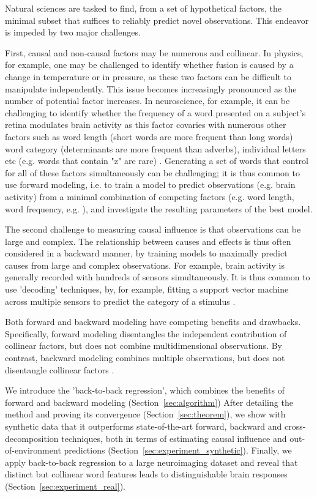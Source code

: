 Natural sciences are tasked to find, from a set of hypothetical factors, the minimal subset that suffices to reliably predict novel observations. This endeavor is impeded by two major challenges.

First, causal and non-causal factors may be numerous and collinear. In physics, for example, one may be challenged to identify whether fusion is caused by a change in temperature or in pressure, as these two factors can be difficult to manipulate independently. This issue becomes increasingly pronounced as the number of potential factor increases. In neuroscience, for example, it can be challenging to identify whether the frequency of a word presented on a subject's retina modulates brain activity as this factor covaries with numerous other factors such as word length (short words are more frequent than long words) word category (determinants are more frequent than adverbs), individual letters etc (e.g. words that contain "z" are rare) \citep{kutas2011thirty,pegado2014timing}. Generating a set of words that control for all of these factors simultaneously can be challenging; it is thus common to use forward modeling, i.e. to train a model to predict observations (e.g. brain activity) from a minimal combination of competing factors (e.g. word length, word frequency, e.g. \citep{huth2016natural}), and investigate the resulting parameters of the best model.

The second challenge to measuring causal influence is that observations can be large and complex. The relationship between causes and effects is thus often considered in a backward manner, by training models to maximally predict causes from large and complex observations. For example, brain activity is generally recorded with hundreds of sensors simultaneously. It is thus common to use 'decoding' techniques, by, for example, fitting a support vector machine across multiple sensors to predict the category of a stimulus \citep{cichy2014resolving, king2016brain, kriegeskorte2008representational}.


Both forward and backward modeling have competing benefits and drawbacks. Specifically, forward modeling disentangles the independent contribution of collinear factors, but does not combine multidimensional observations. By contrast, backward modeling combines multiple observations, but does not disentangle collinear factors \citep{weichwald2015causal, hebart2018deconstructing, king2018encoding}.

We introduce the 'back-to-back regression', which combines the benefits of forward and backward modeling (Section~\ref{sec:algorithm}) After detailing the method and proving its convergence (Section~\ref{sec:theorem}), we show with synthetic data that it outperforms state-of-the-art forward, backward and cross-decomposition techniques, both in terms of estimating causal influence and out-of-environment predictions (Section~\ref{sec:experiment_synthetic}). Finally, we apply back-to-back regression to a large neuroimaging dataset and reveal that distinct but collinear word features leads to distinguishable brain responses (Section~\ref{sec:experiment_real}).
